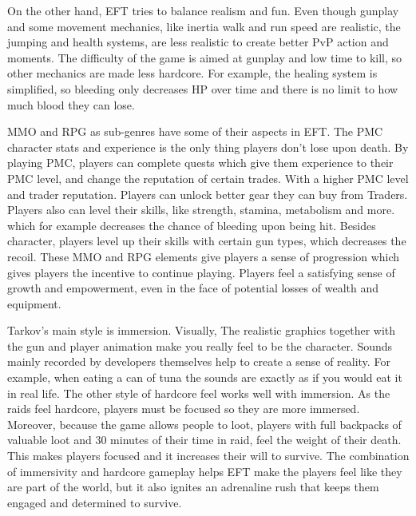 \documentclass[a4paper,10pt,english]{article}
\begin{document}
On the other hand, EFT tries to balance realism and fun. Even though gunplay and some movement mechanics, like inertia walk and run speed are realistic, the jumping and health systems, are less realistic to create better PvP action and moments. The difficulty of the game is aimed at gunplay and low time to kill, so other mechanics are made less hardcore. For example, the healing system is simplified, so bleeding only decreases HP over time and there is no limit to how much blood they can lose.

MMO and RPG as sub-genres have some of their aspects in EFT. The PMC character stats and experience is the only thing players don't lose upon death. By playing PMC, players can complete quests which give them experience to their PMC level, and change the reputation of certain trades. With a higher PMC level and trader reputation. Players can unlock better gear they can buy from Traders. Players also can level their skills, like strength, stamina, metabolism and more. which for example decreases the chance of bleeding upon being hit. Besides character, players level up their skills with certain gun types, which decreases the recoil. These MMO and RPG elements give players a sense of progression which gives players the incentive to continue playing. Players feel a satisfying sense of growth and empowerment, even in the face of potential losses of wealth and equipment.

Tarkov's main style is immersion. Visually, The realistic graphics together with the gun and player animation make you really feel to be the character. Sounds mainly recorded by developers themselves help to create a sense of reality. For example, when eating a can of tuna the sounds are exactly as if you would eat it in real life. The other style of hardcore feel works well with immersion. As the raids feel hardcore, players must be focused so they are more immersed. Moreover, because the game allows people to loot, players with full backpacks of valuable loot and 30 minutes of their time in raid, feel the weight of their death. This makes players focused and it increases their will to survive. The combination of immersivity and hardcore gameplay helps EFT make the players feel like they are part of the world, but it also ignites an adrenaline rush that keeps them engaged and determined to survive.
\end{document}
